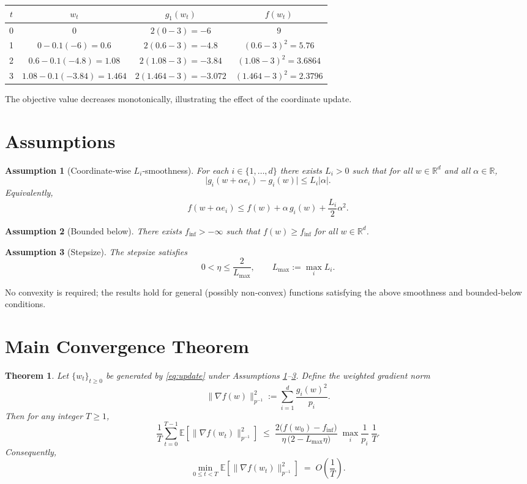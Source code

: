 \documentclass{article}
\newtheorem{theorem}{Theorem}
\newtheorem{assumption}{Assumption}
\newcommand{\EE}{\mathbb{E}}
\newcommand{\RR}{\mathbb{R}}
\begin{document}
\begin{center}
\begin{tabular}{c|c|c|c}
$t$ & $w_t$ & $g_1(w_t)$ & $f(w_t)$\\\hline
0 & $0$ & $2(0-3)=-6$ & $9$\\
1 & $0-0.1(-6)=0.6$ & $2(0.6-3)=-4.8$ & $(0.6-3)^2=5.76$\\
2 & $0.6-0.1(-4.8)=1.08$ & $2(1.08-3)=-3.84$ & $(1.08-3)^2=3.6864$\\
3 & $1.08-0.1(-3.84)=1.464$ & $2(1.464-3)=-3.072$ & $(1.464-3)^2=2.3796$
\end{tabular}
\end{center}
The objective value decreases monotonically, illustrating the effect of the
coordinate update.

\newpage
\section*{Assumptions}
\begin{assumption}[Coordinate‑wise $L_i$‑smoothness]\label{as:smooth}
For each $i\in\{1,\dots ,d\}$ there exists $L_i>0$ such that for all $w\in\RR^{d}$ and
all $\alpha\in\RR$,
\[
\bigl|g_i(w+\alpha e_i)-g_i(w)\bigr|\le L_i|\alpha|.
\]
Equivalently,
\[
f(w+\alpha e_i)\le f(w)+\alpha\,g_i(w)+\frac{L_i}{2}\alpha^{2}.
\tag{A.1}
\]
\end{assumption}

\begin{assumption}[Bounded below]\label{as:bound}
There exists $f_{\inf}>-\infty$ such that $f(w)\ge f_{\inf}$ for all $w\in\RR^{d}$.
\end{assumption}

\begin{assumption}[Stepsize]\label{as:stepsize}
The stepsize satisfies
\[
0<\eta\le \frac{2}{L_{\max}},\qquad L_{\max}:=\max_{i}L_i .
\tag{A.2}
\]
\end{assumption}

No convexity is required; the results hold for general (possibly non‑convex)
functions satisfying the above smoothness and bounded‑below conditions.

\section*{Main Convergence Theorem}
\begin{theorem}\label{thm:main}
Let $\{w_t\}_{t\ge0}$ be generated by \eqref{eq:update} under
Assumptions \ref{as:smooth}–\ref{as:stepsize}.
Define the weighted gradient norm
\[
\| \nabla f(w)\|_{p^{-1}}^{2}
:=\sum_{i=1}^{d}\frac{g_i(w)^{2}}{p_i}.
\]
Then for any integer $T\ge1$,
\[
\frac{1}{T}\sum_{t=0}^{T-1}\EE\!\left[\| \nabla f(w_t)\|_{p^{-1}}^{2}\right]
\;\le\;
\frac{2\bigl(f(w_0)-f_{\inf}\bigr)}{\eta\,\bigl(2-L_{\max}\eta\bigr)}\;
\max_{i}\frac{1}{p_i}\;\frac{1}{T}.
\tag{T.1}
\]
Consequently,
\[
\min_{0\le t<T}\EE\!\left[\| \nabla f(w_t)\|_{p^{-1}}^{2}\right]
\;=\;O\!\left(\frac{1}{T}\right).
\]
\end{theorem}
\end{document}
